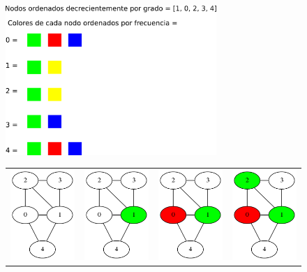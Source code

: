 \documentclass{article}
\theoremstyle{definition}
\theoremstyle{remark}
\begin{document}
\begin{figure}
    \centering
    \includegraphics[width=8cm]{examples/3/example3_title.png}
    \begin{minipage}{1\textwidth}
    \hspace*{+0.5cm}
        \begin{tabular}{cccc}
            \includegraphics[width=3cm]{examples/3/example3_0.png} &
            \includegraphics[width=3cm]{examples/3/example3_1.png} &
            \includegraphics[width=3cm]{examples/3/example3_2.png} &
            \includegraphics[width=3cm]{examples/3/example3_3.png} \\

\end{tabular}
\end{minipage}
\end{figure}
\end{document}
